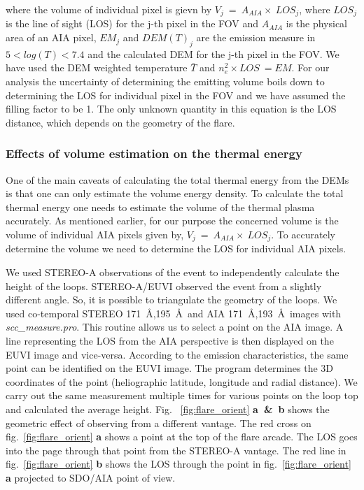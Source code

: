 \documentclass[a4paper,11pt]{article}
\begin{document}
where the volume of individual pixel is gievn by $V_{j}~=~A_{AIA}\times~LOS_{j}$, where $LOS_{j}$ is the line of sight (LOS) for the j-th pixel in the FOV and $A_{AIA}$ is the physical area of an AIA pixel, $EM_{j}$ and $DEM(T)_{j}$ are the emission measure in $5<log(T)<7.4$ and the calculated DEM for the j-th pixel in the FOV. We have used the DEM weighted temperature $\bar{T}$ and $n_{e}^{2}\times LOS~=EM$. For our analysis the uncertainty of determining the emitting volume boils down to determining the LOS for individual pixel in the FOV and we have assumed the filling factor to be 1. The only unknown quantity in this equation is the LOS distance, which depends on the geometry of the flare.

\subsubsection*{Effects of volume estimation on the thermal energy}

One of the main caveats of calculating the total thermal energy from the DEMs is that one can only estimate the volume energy density. To calculate the total thermal energy one needs to estimate the volume of the thermal plasma accurately. As mentioned earlier, for our purpose the concerned volume is the volume of individual AIA pixels given by, $V_{j}~=~A_{AIA}\times~LOS_{j}$. To accurately determine the volume we need to determine the LOS for individual AIA pixels.

We used STEREO-A observations of the event to independently calculate the height of the loops. STEREO-A/EUVI observed the event from a slightly different angle. So, it is possible to triangulate the geometry of the loops. We used co-temporal STEREO 171~\AA,195~\AA~and AIA 171~\AA,193~\AA~images with \textit{scc\_measure.pro}. This routine allows us to select a point on the AIA image. A line representing the LOS from the AIA perspective is then displayed on the EUVI image and vice-versa. According to the emission characteristics, the same point can be identified on the EUVI image. The program determines the 3D coordinates of the point (heliographic latitude, longitude and radial distance). We carry out the same measurement multiple times for various points on the loop top and calculated the average height. Fig.~ \ref{fig:flare_orient} \textbf{a~\&~b} shows the geometric effect of observing from a different vantage. The red cross on fig.~\ref{fig:flare_orient} \textbf{a} shows a point at the top of the flare arcade. The LOS goes into the page through that point from the STEREO-A vantage. The red line in fig.~\ref{fig:flare_orient} \textbf{b} shows the LOS through the point in fig.~\ref{fig:flare_orient} \textbf{a} projected to SDO/AIA point of view.
\end{document}
